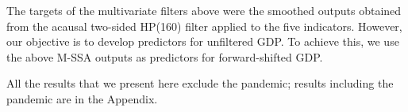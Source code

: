 \documentclass[11pt,a4paper]{article}
\begin{document}
The targets of the multivariate filters above were the smoothed outputs obtained from the acausal two-sided HP(160) filter applied to the five indicators. However, our objective is to develop predictors for unfiltered GDP. To achieve this, we use the above M-SSA outputs as predictors for forward-shifted GDP.

All the results that we present here exclude the pandemic; results including the pandemic are in the Appendix.\\




\end{document}
